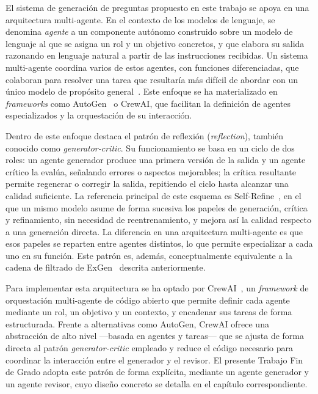El sistema de generación de preguntas propuesto en este trabajo se apoya
en una arquitectura multi-agente. En el contexto de los modelos de
lenguaje, se denomina \emph{agente} a un componente autónomo construido
sobre un modelo de lenguaje al que se asigna un rol y un objetivo
concretos, y que elabora su salida razonando en lenguaje natural a partir
de las instrucciones recibidas. Un sistema multi-agente coordina varios
de estos agentes, con funciones diferenciadas, que colaboran para
resolver una tarea que resultaría más difícil de abordar con un único
modelo de propósito general~\parencite{guo2024multiagents}. Este enfoque
se ha materializado en \emph{frameworks} como
AutoGen~\parencite{wu2023autogen} o CrewAI, que facilitan la definición de
agentes especializados y la orquestación de su interacción.

Dentro de este enfoque destaca el patrón de reflexión (\emph{reflection}),
también conocido como \emph{generator-critic}. Su funcionamiento se basa
en un ciclo de dos roles: un agente generador produce una primera versión
de la salida y un agente crítico la evalúa, señalando errores o aspectos
mejorables; la crítica resultante permite regenerar o corregir la salida,
repitiendo el ciclo hasta alcanzar una calidad suficiente. La referencia
principal de este esquema es Self-Refine~\parencite{madaan2023selfrefine},
en el que un mismo modelo asume de forma sucesiva los papeles de
generación, crítica y refinamiento, sin necesidad de reentrenamiento, y
mejora así la calidad respecto a una generación directa. La diferencia en
una arquitectura multi-agente es que esos papeles se reparten entre
agentes distintos, lo que permite especializar a cada uno en su función.
Este patrón es, además, conceptualmente equivalente a la cadena de
filtrado de ExGen~\parencite{ta2026exgen} descrita anteriormente.

Para implementar esta arquitectura se ha optado por
CrewAI~\parencite{crewai}, un \emph{framework} de orquestación
multi-agente de código abierto que permite definir cada agente mediante
un rol, un objetivo y un contexto, y encadenar sus tareas de forma
estructurada. Frente a alternativas como AutoGen, CrewAI ofrece una
abstracción de alto nivel ---basada en agentes y tareas--- que se ajusta
de forma directa al patrón \emph{generator-critic} empleado y reduce el
código necesario para coordinar la interacción entre el generador y el
revisor. El presente Trabajo Fin de Grado adopta este patrón de forma
explícita, mediante un agente generador y un agente revisor, cuyo diseño
concreto se detalla en el capítulo correspondiente.


